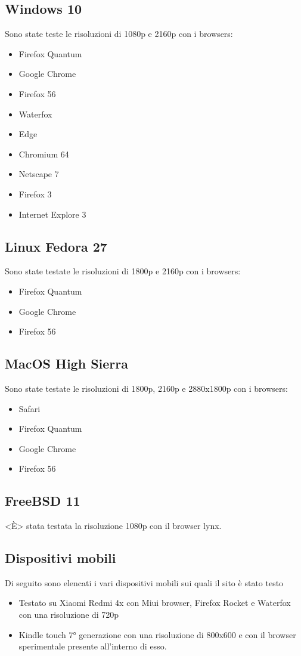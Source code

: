 \documentclass[openany, a4paper, 12pt]{report}
\begin{document}
				\subsection{Windows 10}
				Sono state teste le risoluzioni di 1080p e 2160p con i browsers:
				\begin{itemize}
					\item Firefox Quantum
					\item Google Chrome
					\item Firefox 56
					\item Waterfox
					\item Edge
					\item Chromium 64
					\item Netscape 7
					\item Firefox 3
					\item Internet Explore 3
				\end{itemize}

				\subsection{Linux Fedora 27}
				Sono state testate le risoluzioni di 1800p e 2160p con i browsers:
				\begin{itemize}
					\item Firefox Quantum
					\item Google Chrome
					\item Firefox 56
				\end{itemize}

				\subsection{MacOS High Sierra}
				Sono state testate le risoluzioni di 1800p, 2160p e 2880x1800p con i browsers:
				\begin{itemize}
					\item Safari
					\item Firefox Quantum
					\item Google Chrome
					\item Firefox 56
				\end{itemize}

				\subsection{FreeBSD 11}
				\MakeUppercase{<è>} stata testata la risoluzione 1080p con il browser lynx.

				\subsection{Dispositivi mobili}
				Di seguito sono elencati i vari dispositivi mobili sui quali il sito è stato testo
				\begin{itemize}
				\item Testato su Xiaomi Redmi 4x con Miui browser, Firefox Rocket e Waterfox con una risoluzione di 720p
				\item Kindle touch 7° generazione con una risoluzione di 800x600 e con il browser sperimentale presente all'interno di esso.
				\end{itemize} 
\end{document}
